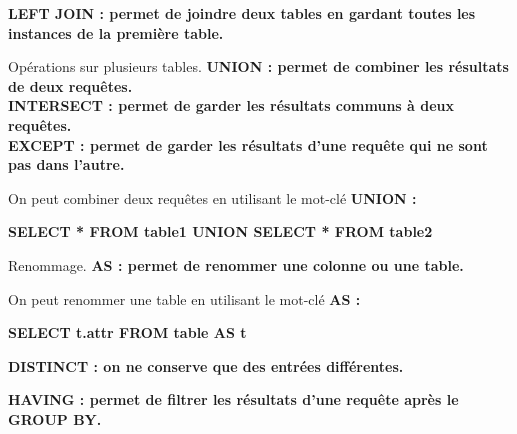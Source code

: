 \documentclass[french, 11pt]{article}
\begin{document}
\begin{defi}{}{}
    \bf{LEFT JOIN} : permet de joindre deux tables en gardant toutes les instances de la première table.
\end{defi}

\vspace*{-0.7cm}

\begin{defi}{Opérations sur plusieurs tables.}{}
    \bf{UNION} : permet de combiner les résultats de deux requêtes.\\
    \bf{INTERSECT} : permet de garder les résultats communs à deux requêtes.\\
    \bf{EXCEPT} : permet de garder les résultats d'une requête qui ne sont pas dans l'autre.
\end{defi}

\vspace*{-0.7cm}

\begin{ex}{}{}
    On peut combiner deux requêtes en utilisant le mot-clé \bf{UNION} :
    \begin{center}
        \bf{SELECT} * \bf{FROM} table1 \bf{UNION} \bf{SELECT} * \bf{FROM} table2
    \end{center}
\end{ex}

\vspace*{-0.7cm}

\begin{defi}{Renommage.}{}
    \bf{AS} : permet de renommer une colonne ou une table.
\end{defi}

\vspace*{-0.7cm}

\begin{ex}{}{}
    On peut renommer une table en utilisant le mot-clé \bf{AS} :
    \begin{center}
        \bf{SELECT} t.attr \bf{FROM} table \bf{AS} t
    \end{center}
\end{ex}

\vspace*{-0.7cm}

\begin{defi}{}{}
    \bf{DISTINCT} : on ne conserve que des entrées différentes.
\end{defi}

\vspace*{-0.7cm}

\begin{defi}{}{}
    \bf{HAVING} : permet de filtrer les résultats d'une requête après le \bf{GROUP BY}.
\end{defi}
\end{document}
